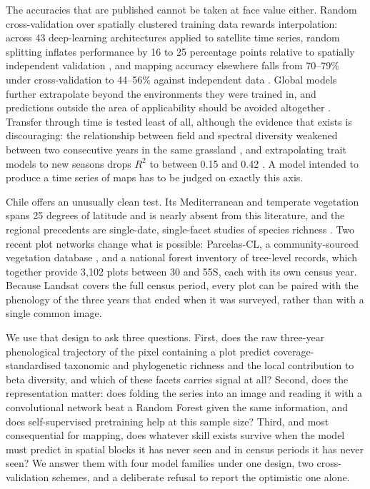 \documentclass[preprint,12pt]{elsarticle}
\begin{document}
The accuracies that are published cannot be taken at face value either. Random
cross-validation over spatially clustered training data rewards interpolation: across 43
deep-learning architectures applied to satellite time series, random splitting inflates
performance by 16 to 25 percentage points relative to spatially independent validation
\citep{arrudabruno2026deep}, and mapping accuracy elsewhere falls from 70--79\% under
cross-validation to 44--56\% against independent data \citep{maynard2019ecological}. Global
models further extrapolate beyond the environments they were trained in, and predictions
outside the area of applicability should be avoided altogether
\citep{meyer2022machine,ludwig2023assessing,ploton2020spatial}. Transfer through time is
tested least of all, although the evidence that exists is discouraging: the relationship
between field and spectral diversity weakened between two consecutive years in the same
grassland \citep{gholizadeh2020multitemporal}, and extrapolating trait models to new
seasons drops $R^2$ to between 0.15 and 0.42 \citep{ji2024leaf}. A model intended to produce
a time series of maps has to be judged on exactly this axis.

Chile offers an unusually clean test. Its Mediterranean and temperate vegetation spans 25
degrees of latitude and is nearly absent from this literature, and the regional precedents
are single-date, single-facet studies of species richness
\citep{ceballos2015comparison,lopatin2016comparing}. Two recent plot networks change what
is possible: Parcelas-CL, a community-sourced vegetation database
\citep{cerdaparedes2026parcelascl}, and a national forest inventory of tree-level records,
which together provide 3,102 plots between 30 and 55\textdegree{}S, each with its own census
year. Because Landsat covers the full census period, every plot can be paired with the
phenology of the three years that ended when it was surveyed, rather than with a single
common image.

We use that design to ask three questions. First, does the raw three-year phenological
trajectory of the pixel containing a plot predict coverage-standardised taxonomic and
phylogenetic richness and the local contribution to beta diversity, and which of these
facets carries signal at all? Second, does the representation matter: does folding the
series into an image and reading it with a convolutional network beat a Random Forest given
the same information, and does self-supervised pretraining help at this sample size?
Third, and most consequential for mapping, does whatever skill exists survive when the
model must predict in spatial blocks it has never seen and in census periods it has never
seen? We answer them with four model families under one design, two cross-validation
schemes, and a deliberate refusal to report the optimistic one alone.
\end{document}
